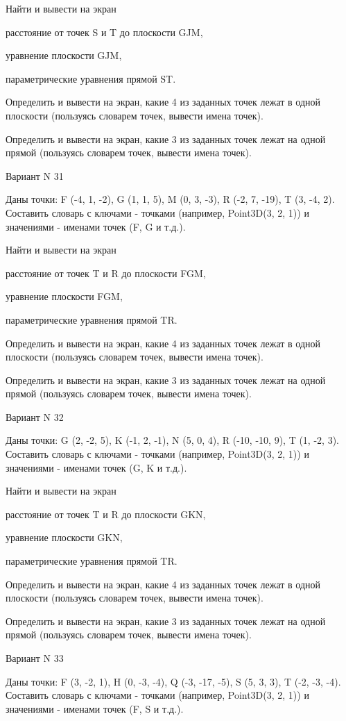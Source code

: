 \documentclass[11pt]{report}
\begin{document}
Найти и вывести на экран


расстояние от точек S и T до плоскости GJM,


уравнение плоскости GJM,


параметрические уравнения прямой ST.


Определить и вывести на экран, какие 4 из заданных точек лежат в одной плоскости (пользуясь словарем точек, вывести имена точек).


Определить и вывести на экран, какие 3 из заданных точек лежат на одной прямой (пользуясь словарем точек, вывести имена точек).

\newpage
Вариант N 31

Даны точки: F (-4, 1, -2), G (1, 1, 5), M (0, 3, -3), R (-2, 7, -19), T (3, -4, 2).
Составить словарь с ключами - точками (например, Point3D(3, 2, 1)) и значениями - именами точек (F, G и т.д.).


Найти и вывести на экран


расстояние от точек T и R до плоскости FGM,


уравнение плоскости FGM,


параметрические уравнения прямой TR.


Определить и вывести на экран, какие 4 из заданных точек лежат в одной плоскости (пользуясь словарем точек, вывести имена точек).


Определить и вывести на экран, какие 3 из заданных точек лежат на одной прямой (пользуясь словарем точек, вывести имена точек).

\newpage
Вариант N 32

Даны точки: G (2, -2, 5), K (-1, 2, -1), N (5, 0, 4), R (-10, -10, 9), T (1, -2, 3).
Составить словарь с ключами - точками (например, Point3D(3, 2, 1)) и значениями - именами точек (G, K и т.д.).


Найти и вывести на экран


расстояние от точек T и R до плоскости GKN,


уравнение плоскости GKN,


параметрические уравнения прямой TR.


Определить и вывести на экран, какие 4 из заданных точек лежат в одной плоскости (пользуясь словарем точек, вывести имена точек).


Определить и вывести на экран, какие 3 из заданных точек лежат на одной прямой (пользуясь словарем точек, вывести имена точек).

\newpage
Вариант N 33

Даны точки: F (3, -2, 1), H (0, -3, -4), Q (-3, -17, -5), S (5, 3, 3), T (-2, -3, -4).
Составить словарь с ключами - точками (например, Point3D(3, 2, 1)) и значениями - именами точек (F, S и т.д.).
\end{document}
